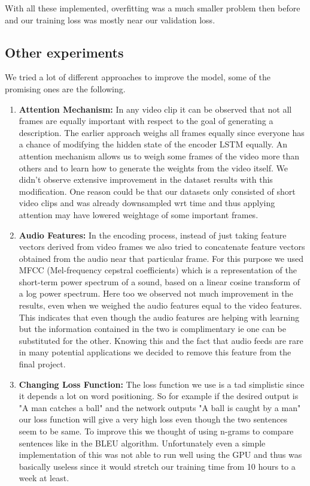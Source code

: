 \documentclass[12pt]{article}
\begin{document}
With all these implemented, overfitting was a much smaller problem then before and our training loss was mostly near our validation loss.
\subsection{Other experiments}

We tried a lot of different approaches to improve the model, some of the promising ones are the following.
\begin{enumerate}

\item \textbf{Attention Mechanism: } In any video clip it can be observed that not all frames are equally important with respect to the goal of generating a description. The earlier approach weighs all frames equally since everyone has a chance of modifying the hidden state of the encoder LSTM equally. An attention mechanism allows us to weigh some frames of the video more than others and to learn how to generate the weights from the video itself. We didn't observe extensive improvement in the dataset results with this modification. One reason could be that our datasets only consisted of short video clips and was already downsampled wrt time and thus applying attention may have lowered weightage of some important frames.
\item \textbf{Audio Features: } In the encoding process, instead of just taking feature vectors derived from video frames we also tried to concatenate feature vectors obtained from the audio near that particular frame. For this purpose we used MFCC (Mel-frequency cepstral coefficients) which is a representation of the short-term power spectrum of a sound, based on a linear cosine transform of a log power spectrum. Here too we observed not much improvement in the results, even when we weighed the audio features equal to the video features. This indicates that even though the audio features are helping with learning but the information contained in the two is complimentary ie one can be substituted for the other. Knowing this and the fact that audio feeds are rare in many potential applications we decided to remove this feature from the final project.
\item \textbf{Changing Loss Function: } The loss function we use is a tad simplistic since it depends a lot on word positioning. So for example if the desired output is "A man catches a ball" and the network outputs "A ball is caught by a man" our loss function will give a very high loss even though the two sentences seem to be same. To improve this we thought of using n-grams to compare sentences like in the BLEU algorithm. Unfortunately even a simple implementation of this was not able to run well using the GPU and thus was basically useless since it would stretch our training time from 10 hours to a week at least.
\end{enumerate}
\end{document}
